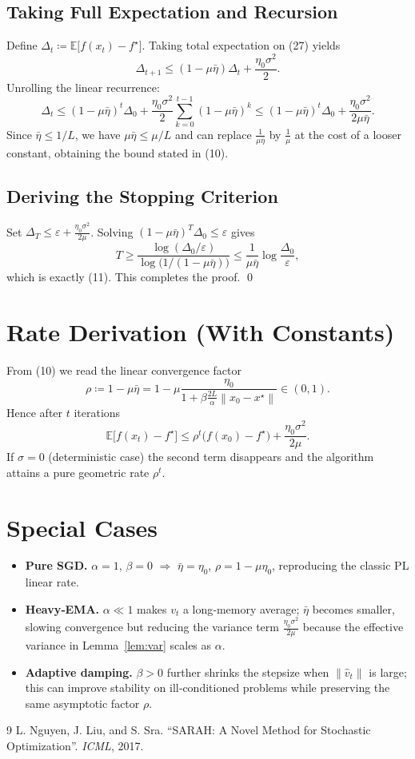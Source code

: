 \documentclass{article}
\newcommand{\E}{\mathbb{E}}
\newcommand{\norm}[1]{\left\|#1\right\|}
\begin{document}
\subsection*{Taking Full Expectation and Recursion}
Define $\Delta_{t}\coloneqq \E\!\bigl[f(x_{t})-f^{\star}\bigr]$. Taking total expectation on (27) yields
\[
\Delta_{t+1}\le (1-\mu\bar\eta)\Delta_{t}+\frac{\eta_{0}\sigma^{2}}{2}.
\tag{28}
\]
Unrolling the linear recurrence:
\[
\Delta_{t}\le (1-\mu\bar\eta)^{t}\Delta_{0}
+\frac{\eta_{0}\sigma^{2}}{2}\sum_{k=0}^{t-1}(1-\mu\bar\eta)^{k}
\le (1-\mu\bar\eta)^{t}\Delta_{0}
+\frac{\eta_{0}\sigma^{2}}{2\mu\bar\eta}.
\tag{29}
\]
Since $\bar\eta\le 1/L$, we have $\mu\bar\eta\le \mu/L$ and can replace $\frac{1}{\mu\bar\eta}$ by $\frac{1}{\mu}$ at the cost of a looser constant, obtaining the bound stated in (10).

\subsection*{Deriving the Stopping Criterion}
Set $\Delta_{T}\le\varepsilon+\frac{\eta_{0}\sigma^{2}}{2\mu}$. Solving $(1-\mu\bar\eta)^{T}\Delta_{0}\le\varepsilon$ gives
\[
T\ge \frac{\log(\Delta_{0}/\varepsilon)}{\log\bigl(1/(1-\mu\bar\eta)\bigr)}
\le \frac{1}{\mu\bar\eta}\log\frac{\Delta_{0}}{\varepsilon},
\tag{30}
\]
which is exactly (11). This completes the proof. \qed

\section*{Rate Derivation (With Constants)}
From (10) we read the linear convergence factor
\[
\rho\coloneqq 1-\mu\bar\eta
=1-\mu\frac{\eta_{0}}{1+\beta\frac{2L}{\alpha}\norm{x_{0}-x^{\star}}}\in(0,1).
\]
Hence after $t$ iterations
\[
\E\!\bigl[f(x_{t})-f^{\star}\bigr]\le \rho^{t}\bigl(f(x_{0})-f^{\star}\bigr)+\frac{\eta_{0}\sigma^{2}}{2\mu}.
\]
If $\sigma=0$ (deterministic case) the second term disappears and the algorithm attains a pure geometric rate $\rho^{t}$.

\section*{Special Cases}
\begin{itemize}
\item \textbf{Pure SGD.} $\alpha=1$, $\beta=0$ $\Rightarrow$ $\bar\eta=\eta_{0}$, $\rho=1-\mu\eta_{0}$, reproducing the classic PL linear rate.
\item \textbf{Heavy‑EMA.} $\alpha\ll1$ makes $v_{t}$ a long‑memory average; $\bar\eta$ becomes smaller, slowing convergence but reducing the variance term $\frac{\eta_{0}\sigma^{2}}{2\mu}$ because the effective variance in Lemma~\ref{lem:var} scales as $\alpha$.
\item \textbf{Adaptive damping.} $\beta>0$ further shrinks the stepsize when $\norm{\hat v_{t}}$ is large; this can improve stability on ill‑conditioned problems while preserving the same asymptotic factor $\rho$.
\end{itemize}

\begin{thebibliography}{9}
L. Nguyen, J. Liu, and S. Sra. “SARAH: A Novel Method for Stochastic Optimization”. \emph{ICML}, 2017.
\end{thebibliography}
\end{document}
